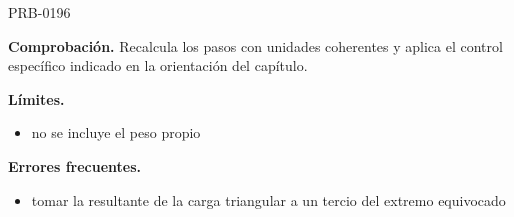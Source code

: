 \begin{studiumworked}{PRB-0196}
\par\textbf{Comprobación.} Recalcula los pasos con unidades coherentes y aplica el control específico indicado en la orientación del capítulo.

\textbf{Límites.}\begin{itemize}\item no se incluye el peso propio\end{itemize}

\textbf{Errores frecuentes.}\begin{itemize}\item tomar la resultante de la carga triangular a un tercio del extremo equivocado\end{itemize}

\end{studiumworked}

\Needspace{.3\textheight}

